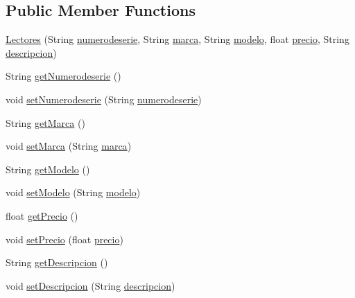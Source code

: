 \subsection*{Public Member Functions}
\begin{DoxyCompactItemize}
\item 
\mbox{\hyperlink{classlibreria_1_1_lectores_a75b63ca81b94c72a5a75932a9e8f5e88}{Lectores}} (String \mbox{\hyperlink{classlibreria_1_1_lectores_acfa30a33712a3e927a4157c46e22dfd2}{numerodeserie}}, String \mbox{\hyperlink{classlibreria_1_1_lectores_ad062e7b5e6ca8443096c555db878b5c5}{marca}}, String \mbox{\hyperlink{classlibreria_1_1_lectores_a1182864ccd674c11609aacc288bb7605}{modelo}}, float \mbox{\hyperlink{classlibreria_1_1_lectores_ae03623755bede2e0f37e40f2cea3fa2f}{precio}}, String \mbox{\hyperlink{classlibreria_1_1_lectores_a3e79587af255ae572a923c0158f00f2a}{descripcion}})
\item 
String \mbox{\hyperlink{classlibreria_1_1_lectores_a1f96de77ef81ae4d91c928d17481bae7}{get\+Numerodeserie}} ()
\item 
void \mbox{\hyperlink{classlibreria_1_1_lectores_a73c52804c84f368cb75d6a110b893163}{set\+Numerodeserie}} (String \mbox{\hyperlink{classlibreria_1_1_lectores_acfa30a33712a3e927a4157c46e22dfd2}{numerodeserie}})
\item 
String \mbox{\hyperlink{classlibreria_1_1_lectores_a889d68331906d1c2401a771db0016f27}{get\+Marca}} ()
\item 
void \mbox{\hyperlink{classlibreria_1_1_lectores_a2677af7cb69e10d064819b3a6b7a101a}{set\+Marca}} (String \mbox{\hyperlink{classlibreria_1_1_lectores_ad062e7b5e6ca8443096c555db878b5c5}{marca}})
\item 
String \mbox{\hyperlink{classlibreria_1_1_lectores_a287118d50589a249dd45533a7971b599}{get\+Modelo}} ()
\item 
void \mbox{\hyperlink{classlibreria_1_1_lectores_aac3a6f7cb3390a10a4fdb388ebab5590}{set\+Modelo}} (String \mbox{\hyperlink{classlibreria_1_1_lectores_a1182864ccd674c11609aacc288bb7605}{modelo}})
\item 
float \mbox{\hyperlink{classlibreria_1_1_lectores_a99c74a428e00256c4cb3f3c19dd2f048}{get\+Precio}} ()
\item 
void \mbox{\hyperlink{classlibreria_1_1_lectores_a6702e7458b7c8cd48c8f7aa335c9fff5}{set\+Precio}} (float \mbox{\hyperlink{classlibreria_1_1_lectores_ae03623755bede2e0f37e40f2cea3fa2f}{precio}})
\item 
String \mbox{\hyperlink{classlibreria_1_1_lectores_ab634d54d16f483a427f9680e7985e930}{get\+Descripcion}} ()
\item 
void \mbox{\hyperlink{classlibreria_1_1_lectores_ae66a09335142d5563e501e05c5f2b15f}{set\+Descripcion}} (String \mbox{\hyperlink{classlibreria_1_1_lectores_a3e79587af255ae572a923c0158f00f2a}{descripcion}})
\end{DoxyCompactItemize}
